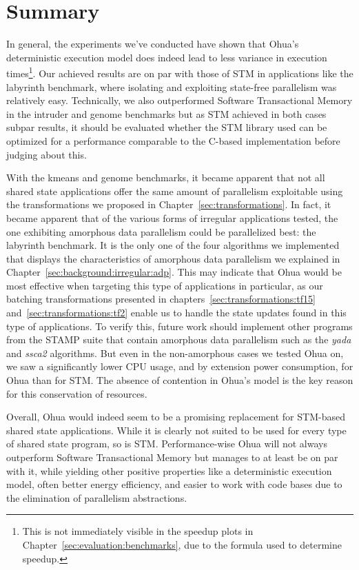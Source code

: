 \section{Summary}%
\label{sec:evaluation:summary}

In general, the experiments we've conducted have shown that Ohua's deterministic execution model does indeed lead to less variance in execution times\footnote{This is not immediately visible in the speedup plots in Chapter~\ref{sec:evaluation:benchmarks}, due to the formula used to determine speedup.}.
Our achieved results are on par with those of STM in applications like the labyrinth benchmark, where isolating and exploiting state-free parallelism was relatively easy.
Technically, we also outperformed Software Transactional Memory in the intruder and genome benchmarks but as STM achieved in both cases subpar results, it should be evaluated whether the STM library used can be optimized for a performance comparable to the C-based implementation before judging about this.

With the kmeans and genome benchmarks, it became apparent that not all shared state applications offer the same amount of parallelism exploitable using the transformations we proposed in Chapter~\ref{sec:transformations}.
In fact, it became apparent that of the various forms of irregular applications tested, the one exhibiting amorphous data parallelism could be parallelized best: the labyrinth benchmark.
It is the only one of the four algorithms we implemented that displays the characteristics of amorphous data parallelism we explained in Chapter~\ref{sec:background:irregular:adp}.
This may indicate that Ohua would be most effective when targeting this type of applications in particular, as our batching transformations presented in chapters~\ref{sec:transformations:tf15} and~\ref{sec:transformations:tf2} enable us to handle the state updates found in this type of applications.
To verify this, future work should implement other programs from the STAMP suite that contain amorphous data parallelism such as the \emph{yada} and \emph{ssca2} algorithms.
But even in the non-amorphous cases we tested Ohua on, we saw a significantly lower CPU usage, and by extension power consumption, for Ohua than for STM.
The absence of contention in Ohua's model is the key reason for this conservation of resources.

Overall, Ohua would indeed seem to be a promising replacement for STM-based shared state applications.
While it is clearly not suited to be used for every type of shared state program, so is STM.
Performance-wise Ohua will not always outperform Software Transactional Memory but manages to at least be on par with it, while yielding other positive properties like a deterministic execution model, often better energy efficiency, and easier to work with code bases due to the elimination of parallelism abstractions.

